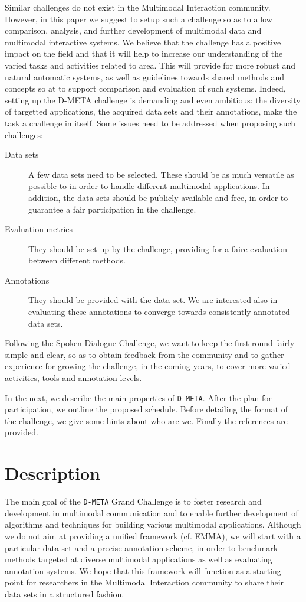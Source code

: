 \documentclass{sig-alternate}
\begin{document}
Similar challenges do not exist in the Multimodal Interaction community. However, in this paper we suggest to setup
such a challenge so as to allow comparison, analysis, and further development of multimodal data and multimodal
interactive systems. We believe that the challenge has a positive impact on the field and that it will help to
increase our understanding of the varied tasks and activities related to area. This will provide for more robust and 
natural automatic systems, as well as guidelines towards shared methods and concepts so at to support comparison and
evaluation of such systems. Indeed, setting up the D-META challenge is demanding and even ambitious: the diversity of
targetted applications, the acquired data sets and their annotations, make the task a challenge in itself. Some issues
need to be addressed when proposing such challenges:
\begin{description}
 \item [Data sets] A few data sets need to be selected. These should be as much versatile as possible to in order to
handle different multimodal applications. In addition, the data sets should be publicly available and free, in order to
guarantee a fair participation in the challenge.
 \item [Evaluation metrics] They should be set up by the challenge, providing for a faire evaluation between different
methods.
 \item [Annotations] They should be provided with the data set. We are interested also in evaluating these annotations
to converge towards consistently annotated data sets.
\end{description}
Following the Spoken Dialogue Challenge, we want to keep the first round fairly simple and clear, so as to obtain
feedback from the community and to gather experience for growing the challenge, in the coming years, to cover more
varied activities, tools and annotation levels.\vspace{0.3cm}

In the next, we describe the main properties of \texttt{D-META}. After the plan for participation, we outline
the proposed schedule. Before detailing the format of the challenge, we give some hints about who are we. Finally the
references are provided.


\section{Description}
The main goal of the \texttt{D-META} Grand Challenge is to foster research and development in multimodal communication
and to enable further development of algorithms and techniques for building various multimodal applications. Although
we do not aim at providing a unified framework (cf. EMMA), we will start with a particular data set and a precise
annotation scheme, in order to benchmark methods targeted at diverse multimodal applications as well as evaluating
annotation systems. We hope that this framework will function as a starting point for researchers in the Multimodal
Interaction community to share their data sets in a structured fashion.\vspace{0.3cm}
\end{document}
